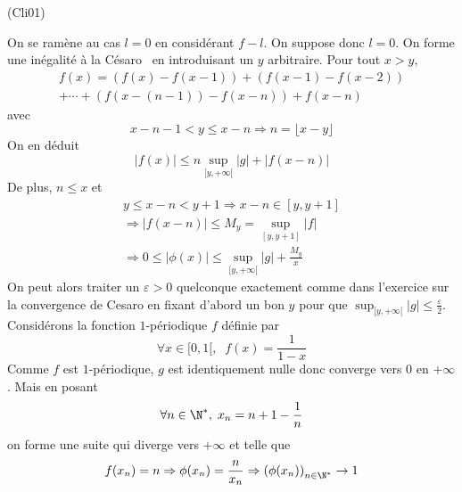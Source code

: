 \begin{tiny}(Cli01)\end{tiny} On se ramène au cas $l=0$ en considérant $f-l$. On suppose donc $l=0$.\newline
On forme une inégalité \og à la Césaro\fg~ en introduisant un $y$ arbitraire. Pour tout $x >y$,
\begin{multline*}
f(x) = 
\left( f(x)-f(x-1)\right) 
+ \left( f(x-1)-f(x-2)\right)\\
+ \cdots 
+ \left( f(x-(n-1))-f(x-n)\right)
+ f(x-n)
\end{multline*}
avec 
\begin{displaymath}
  x-n-1< y \leq x - n \Rightarrow n = \lfloor x-y \rfloor
\end{displaymath}
On en déduit
\begin{displaymath}
|f(x)|\leq  n\sup_{[y,+\infty[}|g| + |f(x-n)|  
\end{displaymath}
De plus, $n\leq x$ et 
\begin{multline*}
  y \leq x-n < y+1 \Rightarrow x - n \in [y,y+1] \\
  \Rightarrow |f(x-n)|\leq M_y = \sup_{[y,y+1]}|f| \\
  \Rightarrow 0 \leq |\phi(x)| \leq \sup_{[y,+\infty[}|g| + \frac{M_y}{x}
\end{multline*}
On peut alors traiter un $\varepsilon>0$ quelconque exactement comme dans l'exercice sur la convergence de Cesaro en fixant d'abord un bon $y$ pour que $\sup_{[y,+\infty[}|g|\leq \frac{\varepsilon}{2}$.\newline
Considérons la fonction $1$-périodique $f$ définie par
\begin{displaymath}
  \forall x\in [0,1[,\; \;f(x) = \frac{1}{1-x}
\end{displaymath}
Comme $f$ est $1$-périodique, $g$ est identiquement nulle donc converge vers $0$ en $+\infty$. Mais en posant 
\begin{displaymath}
\forall n\in \N^*,\; x_n = n + 1 - \frac{1}{n}  
\end{displaymath}
on forme une suite qui diverge vers $+\infty$ et telle que 
\begin{displaymath}
  f(x_n) = n \Rightarrow \phi(x_n) = \frac{n}{x_n}\Rightarrow \left( \phi(x_n)\right)_{n\in \N^*} \rightarrow 1
\end{displaymath}


